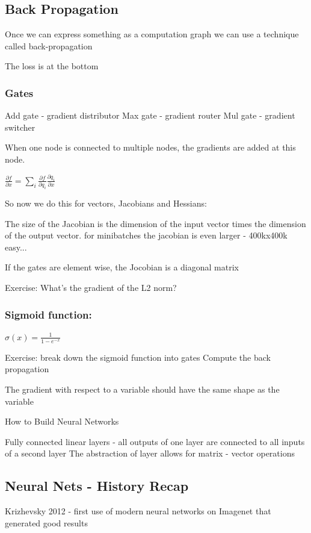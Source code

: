 \subsection{Back Propagation}
Once we  can express something as a computation graph we can use a technique called back-propagation

The loss is at the bottom

\subsubsection{Gates}
Add gate - gradient distributor 
Max gate - gradient router
Mul gate - gradient switcher

When one node is connected to multiple nodes, the gradients are added at this node.

$\frac{\partial f}{\partial x} = \sum_i \frac{\partial f}{\partial q_i}\frac{\partial q_i}{\partial x} $

So now we do this for vectors, Jacobians and Hessians:

The size of the Jacobian is the dimension of the input vector times the dimension of the output vector. for minibatches the jacobian is even larger - 400kx400k easy... 

If the gates are element wise, the Jocobian is a diagonal matrix

Exercise: What's the gradient of the L2 norm? 

\subsubsection{Sigmoid function:}
$\sigma (x) = \frac{1}{1-e^{-x}}$

Exercise: break down the sigmoid function into gates
Compute the back propagation

The gradient with respect to a variable should have the same shape as the variable

How to Build Neural Networks

Fully connected linear layers - all outputs of one layer are connected to all inputs of a second layer
The abstraction of layer allows for matrix - vector operations


 \subsection{Neural Nets - History Recap}

 Krizhevsky 2012 - first use of modern neural networks on Imagenet that generated good results


